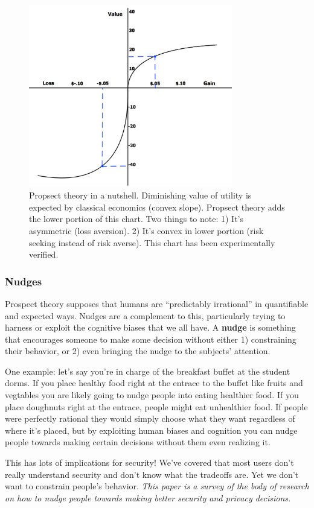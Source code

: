 \documentclass[11pt]{article}
\begin{document}
\begin{figure}[h]
    \centering
    \includegraphics*[width=3.5in]{prospect_theory.png}
    \caption{Propsect theory in a nutshell. Diminishing value of utility is expected by classical economics (convex slope). Propsect theory adds the lower portion of this chart. Two things to note: 1) It's asymmetric (loss aversion). 2) It's convex in lower portion (risk seeking instead of risk averse). This chart has been experimentally verified.}
    \label{fig:ptheory}
\end{figure}
\FloatBarrier

\subsubsection{Nudges}
Prospect theory supposes that humans are ``predictably irrational'' in quantifiable and expected ways.
Nudges are a complement to this, particularly trying to harness or exploit the cognitive biases that we all have.  
A {\bf nudge} is something that encourages someone to make some decision without either 1) constraining their behavior, or 2) even bringing the nudge to the subjects' attention.

One example: let's say you're in charge of the breakfast buffet at the student dorms. If you place healthy food right at the entrace to the buffet like fruits and vegtables you are likely going to nudge people into eating healthier food. If you place doughnuts right at the entrace, people might eat unhealthier food. If people were perfectly rational they would simply choose what they want regardless of where it's placed, but by exploiting human biases and cognition you can nudge people towards making certain decisions without them even realizing it. 

This has lots of implications for security! We've covered that most users don't really understand security and don't know what the tradeoffs are. Yet we don't want to constrain people's behavior. {\it This paper is a survey of the body of research on how to nudge people towards making better security and privacy decisions.}
\end{document}
